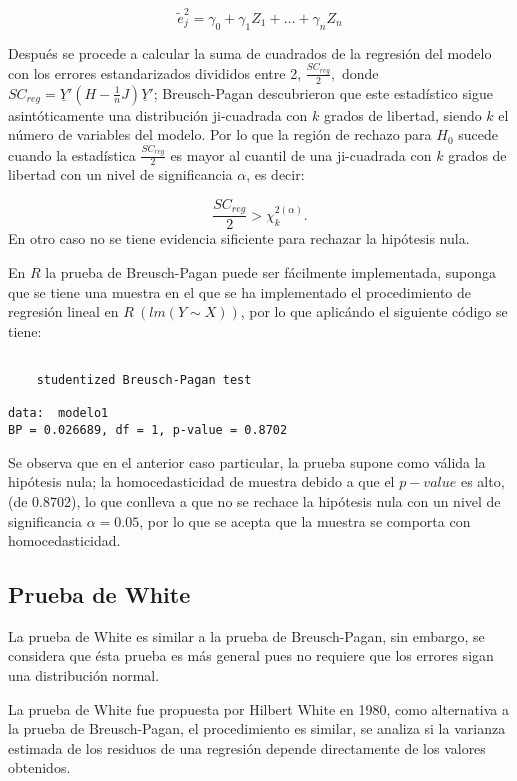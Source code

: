 \documentclass[
  a4paper,
  oneside,
  openany]{book}
\begin{document}
\[\tilde{e}_{j}^{2}=\gamma_{0}+\gamma_{1}Z_{1}+ \ldots + \gamma_{n}Z_{n}\]

Después se procede a calcular la suma de cuadrados de la regresión del modelo con los errores estandarizados divididos entre 2, \(\frac{SC_{reg}}{2},\) donde \(SC_{reg}=\underline{Y}'(H-\frac{1}{n}J)\underline{Y}'\); Breusch-Pagan descubrieron que este estadístico sigue asintóticamente una distribución ji-cuadrada con \(k\) grados de libertad, siendo \(k\) el número de variables del modelo. Por lo que la región de rechazo para \(H_0\) sucede cuando la estadística \(\frac{SC_{reg}}{2}\) es mayor al cuantil de una ji-cuadrada con \(k\) grados de libertad con un nivel de significancia \(\alpha\), es decir:

\[\frac{SC_{reg}}{2}> \chi^{2(\alpha)}_{k}.\]
En otro caso no se tiene evidencia sificiente para rechazar la hipótesis nula.

En \(R\) la prueba de Breusch-Pagan puede ser fácilmente implementada, suponga que se tiene una muestra en el que se ha implementado el procedimiento de regresión lineal en \(R \ (lm(Y \sim X))\), por lo que aplicándo el siguiente código se tiene:

\begin{verbatim}

    studentized Breusch-Pagan test

data:  modelo1
BP = 0.026689, df = 1, p-value = 0.8702
\end{verbatim}

Se observa que en el anterior caso particular, la prueba supone como válida la hipótesis nula; la homocedasticidad de muestra debido a que el \(p-value\) es alto, (de 0.8702), lo que conlleva a que no se rechace la hipótesis nula con un nivel de significancia \(\alpha=0.05\), por lo que se acepta que la muestra se comporta con homocedasticidad.

\hypertarget{prueba-de-white}{%
\subsection{Prueba de White}\label{prueba-de-white}}

La prueba de White es similar a la prueba de Breusch-Pagan, sin embargo, se considera que ésta prueba es más general pues no requiere que los errores sigan una distribución normal.

La prueba de White fue propuesta por Hilbert White en 1980, como alternativa a la prueba de Breusch-Pagan, el procedimiento es similar, se analiza si la varianza estimada de los residuos de una regresión depende directamente de los valores obtenidos.
\end{document}
